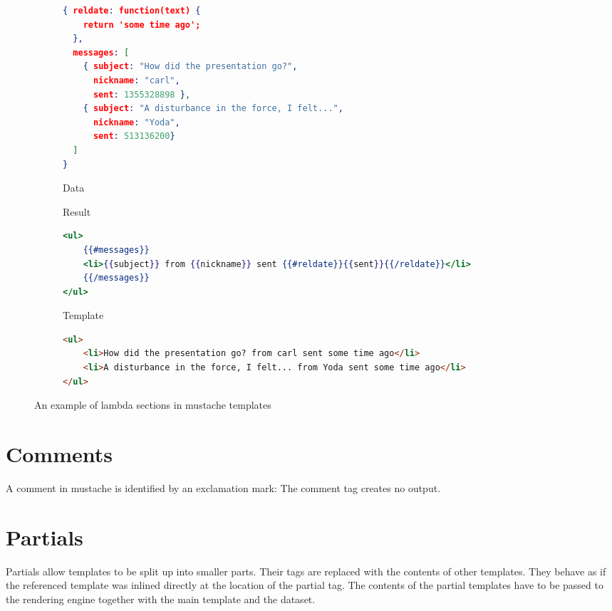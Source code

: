 \documentclass[thesis.tex]{subfiles}
\begin{document}
\begin{figure}
	\centering
	\begin{subfigure}{\linewidth}
		\caption{Data}
		\label{fig:lambda-example.data}
		\begin{lstlisting}[language=JSON]
{ reldate: function(text) {
  	return 'some time ago';
  },
  messages: [
  	{ subject: "How did the presentation go?",
  	  nickname: "carl",
  	  sent: 1355328898 },
  	{ subject: "A disturbance in the force, I felt...",
  	  nickname: "Yoda",
  	  sent: 513136200}
  ]
}
		\end{lstlisting}
	\end{subfigure}
	
	\begin{subfigure}{\linewidth}
		\caption{Result}
		\label{fig:lambda-example.html}
		\begin{lstlisting}[language=mustache]
<ul>
	{{#messages}}
	<li>{{subject}} from {{nickname}} sent {{#reldate}}{{sent}}{{/reldate}}</li>
	{{/messages}}
</ul>
		\end{lstlisting}
		\caption{Template}
		\label{fig:lambda-example.mustache}
	\end{subfigure}
	
	\begin{subfigure}{\linewidth}
		\begin{lstlisting}[language=HTML]
<ul>
	<li>How did the presentation go? from carl sent some time ago</li>
	<li>A disturbance in the force, I felt... from Yoda sent some time ago</li>
</ul>
		\end{lstlisting}
	\end{subfigure}
	\caption{An example of lambda sections in mustache templates}
	\label{fig:lambda-example}
\end{figure}

\section{Comments}
\label{app:mustache-comment}
A comment in mustache is identified by an exclamation mark:
The comment tag creates no output.

\section{Partials}
\label{app:mustache-partial}
Partials allow templates to be split up into smaller parts. Their tags are
replaced with the contents of other templates. They behave as if the referenced
template was inlined directly at the location of the partial tag.
The contents of the partial templates have to be passed to the rendering engine
together with the main template and the dataset.
\end{document}
